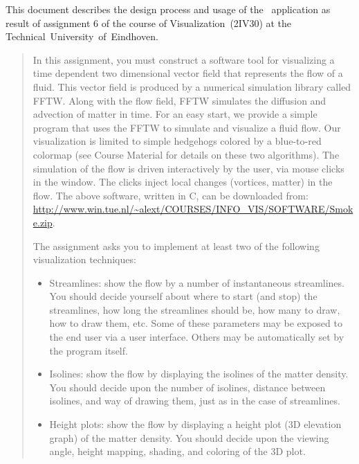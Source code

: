 
This document describes the design process and usage of the \fluids\
application as result of assignment 6 of the course of Visualization~(2IV30) at
the Technical~University~of~Eindhoven.

\begin{quote}

In this assignment, you must construct a software tool for visualizing a time
dependent two dimensional vector field that represents the flow of a fluid.
This vector field is produced by a numerical simulation library called FFTW.
Along with the flow field, FFTW simulates the diffusion and advection of matter
in time. For an easy start, we provide a simple program that uses the FFTW to
simulate and visualize a fluid flow. Our visualization is limited to simple
hedgehogs colored by a blue-to-red colormap (see Course Material for details on
these two algorithms). The simulation of the flow is driven interactively by
the user, via mouse clicks in the window. The clicks inject local changes
(vortices, matter) in the flow.  The above software, written in C, can be
downloaded from:
\url{http://www.win.tue.nl/~alext/COURSES/INFO_VIS/SOFTWARE/Smoke.zip}.

The assignment asks you to implement at least two of the following
visualization techniques: 

\begin{itemize} 

  \item Streamlines: show the flow by a number of instantaneous streamlines.
  You should decide yourself about where to start (and stop) the streamlines,
  how long the streamlines should be, how many to draw, how to draw them,
  etc. Some of these parameters may be exposed to the end user via a user
  interface. Others may be automatically set by the program itself. 


  \item Isolines: show the flow by displaying the isolines of the matter
  density. You should decide upon the number of isolines, distance between
  isolines, and way of drawing them, just as in the case of streamlines. 

  \item Height plots: show the flow by displaying a height plot (3D elevation
  graph) of the matter density. You should decide upon the viewing angle,
  height mapping, shading, and coloring of the 3D plot. 

\end{itemize}


\end{quote}
